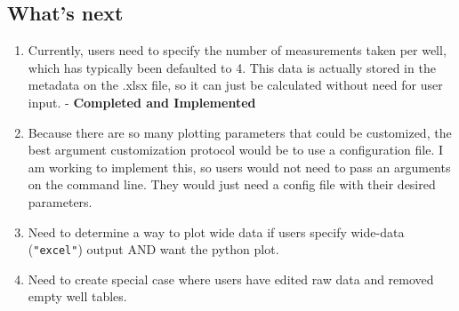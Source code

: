 \documentclass[12pt]{article}
\begin{document}
\subsection*{What's next}
\label{sec:org66a7f80}
\begin{enumerate}
\item Currently, users need to specify the number of measurements taken per well, which has typically been defaulted to 4. This data is actually stored in the metadata on the .xlsx file, so it can just be calculated without need for user input. - \textbf{Completed and Implemented}
\item Because there are so many plotting parameters that could be customized, the best argument customization protocol would be to use a configuration file. I am working to implement this, so users would not need to pass an arguments on the command line. They would just need a config file with their desired parameters.
\item Need to determine a way to plot wide data if users specify wide-data (\texttt{"excel"}) output AND want the python plot.
\item Need to create special case where users have edited raw data and removed empty well tables.
\end{enumerate}
\end{document}
